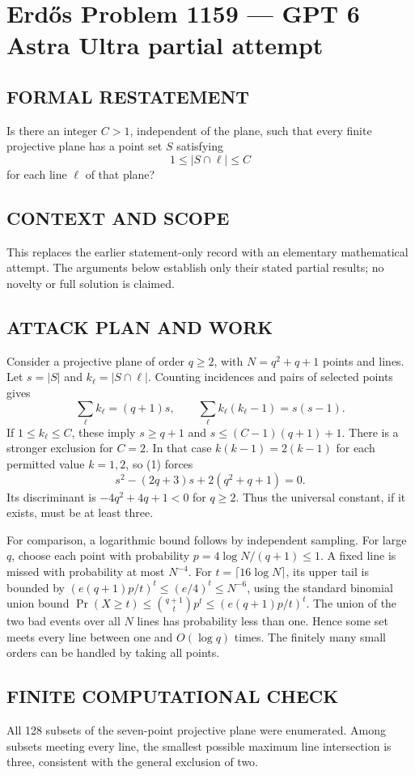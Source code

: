 \section*{Erd\H{o}s Problem 1159 --- GPT 6 Astra Ultra partial attempt}


\subsection*{FORMAL RESTATEMENT}
Is there an integer $C>1$, independent of the plane, such that every finite projective plane has a point set $S$ satisfying
\[
1\leq |S\cap\ell|\leq C
\]
for each line $\ell$ of that plane?

\subsection*{CONTEXT AND SCOPE}
This replaces the earlier statement-only record with an elementary mathematical attempt. The arguments below establish only their stated partial results; no novelty or full solution is claimed.

\subsection*{ATTACK PLAN AND WORK}
Consider a projective plane of order $q\ge2$, with $N=q^2+q+1$ points and lines.
Let $s=|S|$ and $k_\ell=|S\cap\ell|$. Counting incidences and pairs of selected
points gives
\[\sum_\ell k_\ell=(q+1)s,\qquad
\sum_\ell k_\ell(k_\ell-1)=s(s-1).\tag{1}\]
If $1\le k_\ell\le C$, these imply
$s\ge q+1$ and $s\le(C-1)(q+1)+1$.
There is a stronger exclusion for $C=2$. In that case
$k(k-1)=2(k-1)$ for each permitted value $k=1,2$, so (1) forces
\[s^2-(2q+3)s+2(q^2+q+1)=0.\]
Its discriminant is $-4q^2+4q+1<0$ for $q\ge2$. Thus the universal constant,
if it exists, must be at least three.

For comparison, a logarithmic bound follows by independent sampling.
For large $q$, choose each point with probability $p=4\log N/(q+1)\le1$.
A fixed line is missed with probability at most $N^{-4}$.
For $t=\lceil16\log N\rceil$, its upper tail is bounded by
$(e(q+1)p/t)^t\le(e/4)^t\le N^{-6}$, using the standard binomial union bound
$\Pr(X\ge t)\le\binom{q+1}{t}p^t\le(e(q+1)p/t)^t$.
The union of the two bad events over all $N$ lines has probability less than one.
Hence some set meets every line between one and $O(\log q)$ times. The finitely
many small orders can be handled by taking all points.

\subsection*{FINITE COMPUTATIONAL CHECK}
All 128 subsets of the seven-point projective plane were enumerated. Among subsets meeting every line, the smallest possible maximum line intersection is three, consistent with the general exclusion of two.


